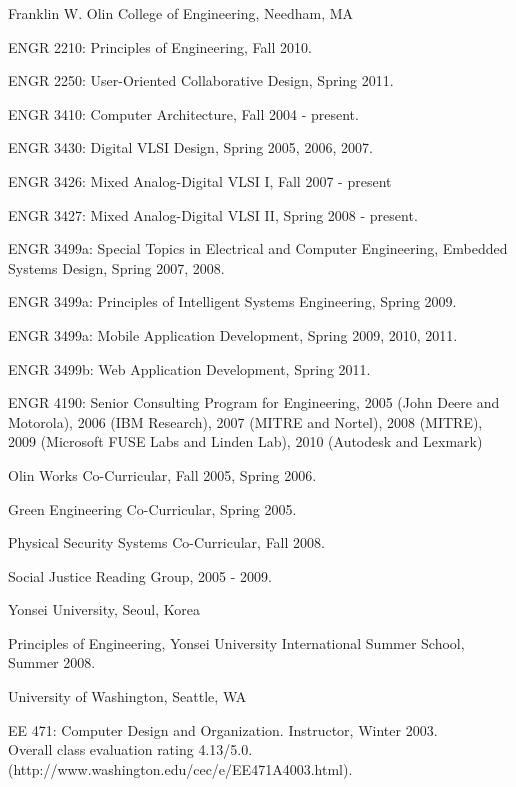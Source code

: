 \documentclass[line]{res}
\newenvironment{list1}{
  \begin{list}{\ding{113}}{%
      \setlength{\itemsep}{0in}
      \setlength{\parsep}{0in} \setlength{\parskip}{0in}
      \setlength{\topsep}{0in} \setlength{\partopsep}{0in} 
      \setlength{\leftmargin}{0.17in}}}{\end{list}}
\begin{document}
\begin{resume}
	Franklin W. Olin College of Engineering, Needham, MA\\
	\vspace{-.1in} 
	\begin{list1}
		\item[] ENGR 2210: Principles of Engineering, Fall 2010. 
		\item[] ENGR 2250: User-Oriented Collaborative Design, Spring 2011. 
		\item[] ENGR 3410: Computer Architecture, Fall 2004 - present. 
		\item[] ENGR 3430: Digital VLSI Design, Spring 2005, 2006, 2007. 
		\item[] ENGR 3426: Mixed Analog-Digital VLSI I, Fall 2007 - present 
		\item[] ENGR 3427: Mixed Analog-Digital VLSI II, Spring 2008 - present. 
		\item[] ENGR 3499a: Special Topics in Electrical and Computer Engineering, Embedded Systems Design, Spring 2007, 2008. 
		\item[] ENGR 3499a: Principles of Intelligent Systems Engineering, Spring 2009. 
		\item[] ENGR 3499a: Mobile Application Development, Spring 2009, 2010, 2011. 
		\item[] ENGR 3499b: Web Application Development, Spring 2011. 
		\item[] ENGR 4190: Senior Consulting Program for Engineering, 2005 (John Deere and Motorola), 2006 (IBM Research), 2007 (MITRE and Nortel), 2008 (MITRE), 2009 (Microsoft FUSE Labs and Linden Lab), 2010 (Autodesk and Lexmark) 
		\item[] Olin Works Co-Curricular, Fall 2005, Spring 2006. 
		\item[] Green Engineering Co-Curricular, Spring 2005. 
		\item[] Physical Security Systems Co-Curricular, Fall 2008. 
		\item[] Social Justice Reading Group, 2005 - 2009. 
	\end{list1}
	
	Yonsei University, Seoul, Korea\\
	\vspace{-.1in} 
	\begin{list1}
		\item[] Principles of Engineering, Yonsei University International Summer School, Summer 2008. 
	\end{list1}
	
	University of Washington, Seattle, WA\\
	\vspace{-.1in} 
	\begin{list1}
		\item[] EE 471: Computer Design and Organization. Instructor, Winter 2003.\\
		Overall class evaluation rating 4.13/5.0.\\
		(http://www.washington.edu/cec/e/EE471A4003.html). 
	\end{list1}
	

\end{resume}
\end{document}
